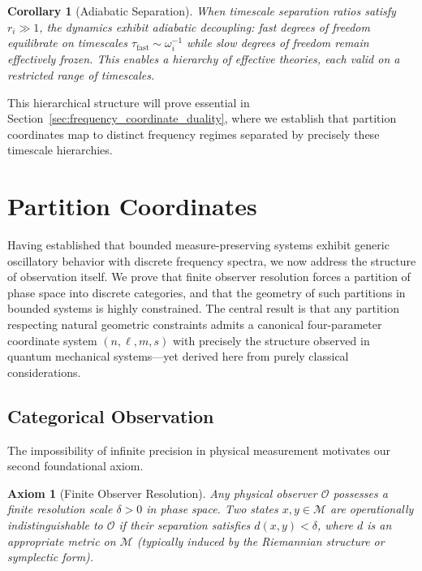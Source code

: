 \documentclass[twocolumn,10pt,a4paper]{article}
\newtheorem{corollary}[theorem]{Corollary}
\newtheorem{axiom}{Axiom}
\theoremstyle{remark}
\newcommand{\manifold}{\mathcal{M}}
\begin{document}
\begin{corollary}[Adiabatic Separation]
\label{cor:adiabatic}
When timescale separation ratios satisfy $r_i \gg 1$, the dynamics exhibit adiabatic decoupling: fast degrees of freedom equilibrate on timescales $\tau_{\text{fast}} \sim \omega_i^{-1}$ while slow degrees of freedom remain effectively frozen. This enables a hierarchy of effective theories, each valid on a restricted range of timescales.
\end{corollary}

This hierarchical structure will prove essential in Section~\ref{sec:frequency_coordinate_duality}, where we establish that partition coordinates map to distinct frequency regimes separated by precisely these timescale hierarchies.

\section{Partition Coordinates}
\label{sec:partition_coordinates}

Having established that bounded measure-preserving systems exhibit generic oscillatory behavior with discrete frequency spectra, we now address the structure of observation itself. We prove that finite observer resolution forces a partition of phase space into discrete categories, and that the geometry of such partitions in bounded systems is highly constrained. The central result is that any partition respecting natural geometric constraints admits a canonical four-parameter coordinate system $(n, \ell, m, s)$ with precisely the structure observed in quantum mechanical systems—yet derived here from purely classical considerations.

\subsection{Categorical Observation}

The impossibility of infinite precision in physical measurement motivates our second foundational axiom.

\begin{axiom}[Finite Observer Resolution]
\label{ax:finite_resolution}
Any physical observer $\mathcal{O}$ possesses a finite resolution scale $\delta > 0$ in phase space. Two states $x, y \in \manifold$ are \emph{operationally indistinguishable} to $\mathcal{O}$ if their separation satisfies $d(x, y) < \delta$, where $d$ is an appropriate metric on $\manifold$ (typically induced by the Riemannian structure or symplectic form).
\end{axiom}
\end{document}
